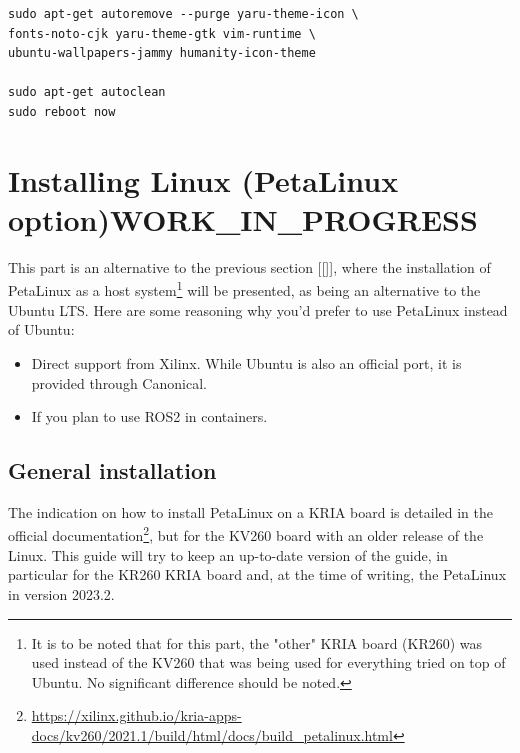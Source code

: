 \documentclass[10pt]{article}
\begin{document}
\begin{verbatim}
sudo apt-get autoremove --purge yaru-theme-icon \
fonts-noto-cjk yaru-theme-gtk vim-runtime \
ubuntu-wallpapers-jammy humanity-icon-theme

sudo apt-get autoclean
sudo reboot now
\end{verbatim}

\section{Installing Linux (PetaLinux option)\hfill{}\textsc{WORK\_IN\_PROGRESS}}
\label{sec:orgb97e53c}
This part is an alternative to the previous section [[]], where the installation
of PetaLinux as a host system\footnote{It is to be noted that for this part, the "other" KRIA board (KR260) was
used instead of the KV260 that was being used for everything tried on top of
Ubuntu. No significant difference should be noted.} will be presented, as being an alternative to the
Ubuntu LTS. Here are some reasoning why you'd prefer to use PetaLinux instead
of Ubuntu:
\begin{itemize}
\item Direct support from Xilinx. While Ubuntu is also an official port, it is
provided through Canonical.
\item If you plan to use ROS2 in containers.
\end{itemize}

\subsection{General installation}
\label{sec:org659e26d}
The indication on how to install PetaLinux on a KRIA board is detailed in the
official documentation\footnote{\url{https://xilinx.github.io/kria-apps-docs/kv260/2021.1/build/html/docs/build\_petalinux.html}}, but for the KV260 board with an older release of
the Linux. This guide will try to keep an up-to-date version of the guide, in
particular for the KR260 KRIA board and, at the time of writing, the PetaLinux
in version 2023.2.
\end{document}
